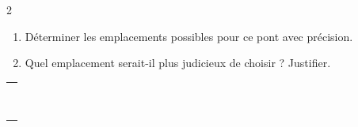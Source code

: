 \documentclass[a4paper]{book}
\begin{document}
{\begin{exerciceNote}{2}
\begin{minipage}{0.5\linewidth}
            \begin{enumerate}[leftmargin=*]
                \item Déterminer les emplacements possibles pour ce pont avec précision.

                \item Quel emplacement serait-il plus judicieux de choisir ? Justifier.
            \end{enumerate}
        \end{minipage}
        \hfill
        \begin{minipage}{0.49\linewidth}
            \begin{center}
            \end{center}
        \end{minipage}

        \begin{tabular}{|p{16cm}|}
            \hline \\ \\ \\ \\ \\ \\ \\ \\ \\ \hline            
        \end{tabular}
    \end{exerciceNote}
    
}
\end{document}

